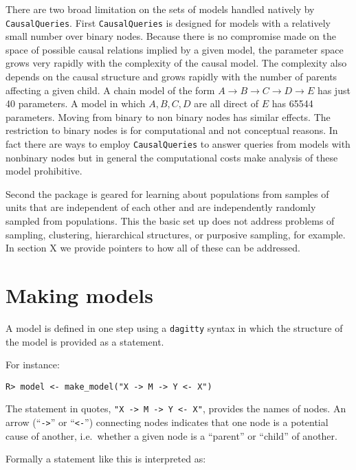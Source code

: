 \documentclass[
  11pt,
  article]{jss}
\begin{document}
There are two broad limitation on the sets of models handled natively by
\texttt{CausalQueries}. First \texttt{CausalQueries} is designed for
models with a relatively small number over binary nodes. Because there
is no compromise made on the space of possible causal relations implied
by a given model, the parameter space grows very rapidly with the
complexity of the causal model. The complexity also depends on the
causal structure and grows rapidly with the number of parents affecting
a given child. A chain model of the form
\(A \rightarrow B \rightarrow C \rightarrow D \rightarrow E\) has just
40 parameters. A model in which \(A, B, C, D\) are all direct of \(E\)
has 65544 parameters. Moving from binary to non binary nodes has similar
effects. The restriction to binary nodes is for computational and not
conceptual reasons. In fact there are ways to employ
\texttt{CausalQueries} to answer queries from models with nonbinary
nodes but in general the computational costs make analysis of these
model prohibitive.

Second the package is geared for learning about populations from samples
of units that are independent of each other and are independently
randomly sampled from populations. This the basic set up does not
address problems of sampling, clustering, hierarchical structures, or
purposive sampling, for example. In section X we provide pointers to how
all of these can be addressed.

\hypertarget{sec-models}{%
\section{Making models}\label{sec-models}}

A model is defined in one step using a \texttt{dagitty} syntax in which
the structure of the model is provided as a statement.

For instance:

\begin{verbatim}
R> model <- make_model("X -> M -> Y <- X")
\end{verbatim}

The statement in quotes,
\texttt{"X\ -\textgreater{}\ M\ -\textgreater{}\ Y\ \textless{}-\ X"},
provides the names of nodes. An arrow (``\texttt{-\textgreater{}}'' or
``\texttt{\textless{}-}'') connecting nodes indicates that one node is a
potential cause of another, i.e.~whether a given node is a ``parent'' or
``child'' of another.

Formally a statement like this is interpreted as:
\end{document}

